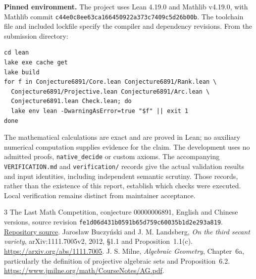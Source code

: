 \documentclass[11pt,a4paper]{article}
\newcommand{\code}[1]{\nolinkurl{#1}}
\begin{document}
\textbf{Pinned environment.}
The project uses Lean 4.19.0 and Mathlib v4.19.0, with Mathlib commit
\code{c44e0c8ee63ca166450922a373c7409c5d26b00b}. The toolchain file and included lockfile specify the compiler and dependency revisions. From the submission directory:
\begin{Verbatim}[fontsize=\small]
cd lean
lake exe cache get
lake build
for f in Conjecture6891/Core.lean Conjecture6891/Rank.lean \
  Conjecture6891/Projective.lean Conjecture6891/Arc.lean \
  Conjecture6891.lean Check.lean; do
  lake env lean -DwarningAsError=true "$f" || exit 1
done
\end{Verbatim}
The mathematical calculations are exact and are proved in Lean; no auxiliary numerical computation supplies evidence for the claim. The development uses no admitted proofs, \code{native_decide} or custom axioms. The accompanying \code{VERIFICATION.md} and \code{verification/} records give the actual validation results and input identities, including independent semantic scrutiny. Those records, rather than the existence of this report, establish which checks were executed. Local verification remains distinct from maintainer acceptance.

\begin{thebibliography}{3}\small
{} The Last Math Competition, conjecture 00000006891, English and Chinese versions, source revision \code{fe1d06d431b0591b65d759c60035b1d2e293a819}. \href{https://github.com/The-Last-Math-Competition/The-Last-Math-Competition/blob/fe1d06d431b0591b65d759c60035b1d2e293a819/conjectures/00000006891.md}{Repository source}.
\bibitem{landsberg} Jaros{\l}aw Buczy{\'n}ski and J. M. Landsberg, \emph{On the third secant variety}, arXiv:1111.7005v2, 2012, \S1.1 and Proposition~1.1(c). \url{https://arxiv.org/abs/1111.7005}.
\bibitem{milne} J. S. Milne, \emph{Algebraic Geometry}, Chapter~6a, particularly the definition of projective algebraic sets and Proposition~6.2. \url{https://www.jmilne.org/math/CourseNotes/AG.pdf}.
\end{thebibliography}
\end{document}
